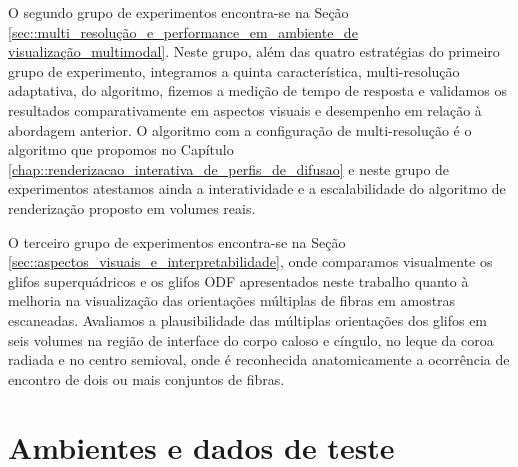 O segundo grupo de experimentos encontra-se na Seção \ref{sec::multi_resolução_e_performance_em_ambiente_de visualização_multimodal}. Neste grupo, além das quatro estratégias do primeiro grupo de experimento, integramos a quinta característica, multi-resolução adaptativa, do algoritmo, fizemos a medição de tempo de resposta e validamos os resultados comparativamente em aspectos visuais e desempenho em relação à abordagem anterior. O algoritmo com a configuração de multi-resolução é o algoritmo que propomos no Capítulo \ref{chap::renderizacao_interativa_de_perfis_de_difusao} e neste grupo de experimentos atestamos ainda a interatividade e a escalabilidade do algoritmo de renderização proposto em volumes reais.


O terceiro grupo de experimentos encontra-se na Seção \ref{sec::aspectos_visuais_e_interpretabilidade}, onde comparamos visualmente os glifos superquádricos e os glifos ODF apresentados neste trabalho quanto à melhoria na visualização das orientações múltiplas de fibras em amostras escaneadas. Avaliamos a plausibilidade das múltiplas orientações dos glifos em seis volumes na região de interface do corpo caloso e cíngulo, no leque da coroa radiada e no centro semioval, onde é reconhecida anatomicamente a ocorrência de encontro de dois ou mais conjuntos de fibras.
 

\section{Ambientes e dados de teste}
\label{sec::ambientes_e_dados_de_dados}


